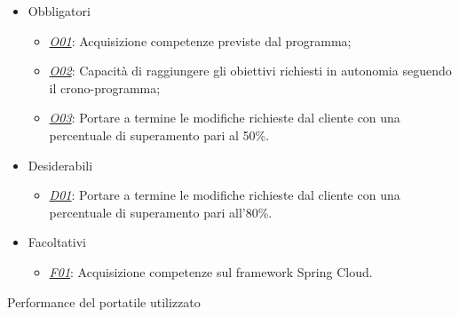\begin{itemize}[noitemsep]
	\item Obbligatori
	\begin{itemize}
		\item \underline{\textit{O01}}: Acquisizione competenze previste dal programma;
		\item \underline{\textit{O02}}: Capacità di raggiungere gli obiettivi richiesti in autonomia seguendo il crono-programma;
		\item \underline{\textit{O03}}: Portare a termine le modifiche richieste dal cliente con una percentuale di superamento pari al 50\%.
	\end{itemize}
	\item Desiderabili
	\begin{itemize}
		\item \underline{\textit{D01}}: Portare a termine le modifiche richieste dal cliente con una percentuale di superamento pari all'80\%.
	\end{itemize}
	\item Facoltativi
	\begin{itemize}
		\item \underline{\textit{F01}}: Acquisizione competenze sul framework Spring Cloud.
	\end{itemize}
\end{itemize}


%

\begin{risk}{Performance del portatile utilizzato}
    \label{risk:hardware-simulator}
\end{risk}

